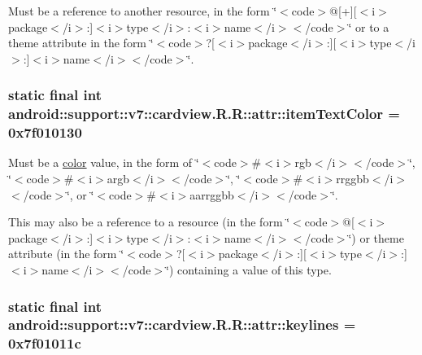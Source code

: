 Must be a reference to another resource, in the form \char`\"{}$<$code$>$@\mbox{[}+\mbox{]}\mbox{[}$<$i$>$package$<$/i$>$:\mbox{]}$<$i$>$type$<$/i$>$:$<$i$>$name$<$/i$>$$<$/code$>$\char`\"{} or to a theme attribute in the form \char`\"{}$<$code$>$?\mbox{[}$<$i$>$package$<$/i$>$:\mbox{]}\mbox{[}$<$i$>$type$<$/i$>$:\mbox{]}$<$i$>$name$<$/i$>$$<$/code$>$\char`\"{}. \hypertarget{classandroid_1_1support_1_1v7_1_1cardview_1_1_r_1_1attr_aa02dc8fca09643ceaed5ce538596b62}{
\subsubsection[{itemTextColor}]{\setlength{\rightskip}{0pt plus 5cm}static final int android::support::v7::cardview.R.R::attr::itemTextColor = 0x7f010130}}
\label{classandroid_1_1support_1_1v7_1_1cardview_1_1_r_1_1attr_aa02dc8fca09643ceaed5ce538596b62}


Must be a \hyperlink{classandroid_1_1support_1_1v7_1_1cardview_1_1_r_1_1color}{color} value, in the form of \char`\"{}$<$code$>$\#$<$i$>$rgb$<$/i$>$$<$/code$>$\char`\"{}, \char`\"{}$<$code$>$\#$<$i$>$argb$<$/i$>$$<$/code$>$\char`\"{}, \char`\"{}$<$code$>$\#$<$i$>$rrggbb$<$/i$>$$<$/code$>$\char`\"{}, or \char`\"{}$<$code$>$\#$<$i$>$aarrggbb$<$/i$>$$<$/code$>$\char`\"{}. 

This may also be a reference to a resource (in the form \char`\"{}$<$code$>$@\mbox{[}$<$i$>$package$<$/i$>$:\mbox{]}$<$i$>$type$<$/i$>$:$<$i$>$name$<$/i$>$$<$/code$>$\char`\"{}) or theme attribute (in the form \char`\"{}$<$code$>$?\mbox{[}$<$i$>$package$<$/i$>$:\mbox{]}\mbox{[}$<$i$>$type$<$/i$>$:\mbox{]}$<$i$>$name$<$/i$>$$<$/code$>$\char`\"{}) containing a value of this type. \hypertarget{classandroid_1_1support_1_1v7_1_1cardview_1_1_r_1_1attr_b5244d8d9e79fc6956b6643361068230}{
\subsubsection[{keylines}]{\setlength{\rightskip}{0pt plus 5cm}static final int android::support::v7::cardview.R.R::attr::keylines = 0x7f01011c}}
\label{classandroid_1_1support_1_1v7_1_1cardview_1_1_r_1_1attr_b5244d8d9e79fc6956b6643361068230}


